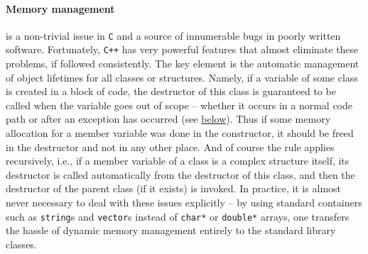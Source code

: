 \documentclass[12pt]{article}
\newcommand{\Cpp}  {\texttt{C++}\xspace}
\begin{document}
\paragraph{Memory management}  is a non-trivial issue in \texttt{C} and a source of innumerable bugs in poorly written software. Fortunately, \Cpp has very powerful features that almost eliminate these problems, if followed consistently. The key element is the automatic management of object lifetimes for all classes or structures. Namely, if a variable of some class is created in a block of code, the destructor of this class is guaranteed to be called when the variable goes out of scope -- whether it occurs in a normal code path or after an exception has occurred (see \hyperref[sec:Exceptions]{below}). Thus if some memory allocation for a member variable was done in the constructor, it should be freed in the destructor and not in any other place. And of course the rule applies recursively, i.e., if a member variable of a class is a complex structure itself, its destructor is called automatically from the destructor of this class, and then the destructor of the parent class (if it exists) is invoked. In practice, it is almost never necessary to deal with these issues explicitly -- by using standard containers such as \texttt{string}s and \texttt{vector}s instead of \texttt{char*} or \texttt{double*} arrays, one transfers the hassle of dynamic memory management entirely to the standard library classes.
\end{document}
